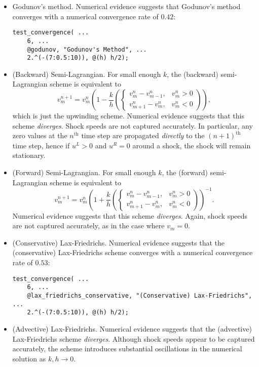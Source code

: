 \documentclass{article}
\begin{document}
\begin{itemize}
\begin{itemize}
\item Godunov's method. Numerical evidence suggests that Godunov's method converges with a numerical convergence rate of $0.42$:
\begin{verbatim}
test_convergence( ...
    6, ...
    @godunov, "Godunov's Method", ...
    2.^(-(7:0.5:10)), @(h) h/2);
\end{verbatim}
\item (Backward) Semi-Lagrangian. For small enough $k$, the (backward) semi-Lagrangian scheme is equivalent to
\begin{equation*}
v^{n+1}_m = v^n_m \left( 1 - \frac{k}{h} \left( \begin{cases} v^n_m - v^n_{m-1}, & v^n_m > 0 \\ v^n_{m+1} - v^n_m, & v^n_m < 0 \end{cases} \right) \right),
\end{equation*}
which is just the upwinding scheme. Numerical evidence suggests that this scheme \emph{diverges}. Shock speeds are not captured accurately. In particular, any zero values at the $n^{\text{th}}$ time step are propagated \emph{directly} to the $(n+1)^{\text{th}}$ time step, hence if $u^L > 0$ and $u^R = 0$ around a shock, the shock will remain stationary.
\item (Forward) Semi-Lagrangian. For small enough $k$, the (forward) semi-Lagrangian scheme is equivalent to
\begin{equation*}
v^{n+1}_m = v^n_m \left( 1 + \frac{k}{h} \left( \begin{cases} v^n_m - v^n_{m-1}, & v^n_m > 0 \\ v^n_{m+1} - v^n_m, & v^n_m < 0 \end{cases} \right) \right)^{-1}.
\end{equation*}
Numerical evidence suggests that this scheme \emph{diverges}. Again, shock speeds are not captured accurately, as in the case where $v_m = 0$.
\item (Conservative) Lax-Friedrichs. Numerical evidence suggests that the (conservative) Lax-Friedrichs scheme converges with a numerical convergence rate of $0.53$:
\begin{verbatim}
test_convergence( ...
    6, ...
    @lax_friedrichs_conservative, "(Conservative) Lax-Friedrichs", ...
    2.^(-(7:0.5:10)), @(h) h/2);
\end{verbatim}
\item (Advective) Lax-Friedrichs. Numerical evidence suggests that the (advective) Lax-Friedrichs scheme \emph{diverges}. Although shock speeds appear to be captured accurately, the scheme introduces substantial oscillations in the numerical solution as $k,h \to 0$.
\end{itemize}


\end{itemize}
\end{document}
